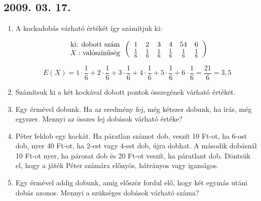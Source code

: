 \subsection*{2009. 03. 17.}
\begin{enumerate}
\item A kockadobás várható értékét így számítjuk ki: 

$$
\begin{array}{c}
\text{ki: dobott szám}\cr
X:\text{valószínűség}
\end{array}
\left(
\begin{array}{cccccc}
1&2&3&4&54&6\cr
\frac{1}{6}&
\frac{1}{6}&
\frac{1}{6}&
\frac{1}{6}&
\frac{1}{6}&
\frac{1}{6}
\end{array}
\right)
$$

$$
E(X)=
1\cdot\frac{1}{6}+
2\cdot\frac{1}{6}+
3\cdot\frac{1}{6}+
4\cdot\frac{1}{6}+
5\cdot\frac{1}{6}+
6\cdot\frac{1}{6}=
\frac{21}{6}=3{,}5
$$








\item Számítsuk ki a két kockával dobott pontok összegének várható értékét.

\item Egy érmével dobunk. Ha az eredmény fej, még kétszer dobunk, ha írás, még egyszer. Mennyi az összes fej dobások várható értéke?

\item Péter feldob egy kockát. Ha páratlan számot dob, veszít 10 Ft-ot, ha 6-ost dob, nyer 40 Ft-ot, ha 2-est vagy 4-est dob, újra dobhat. A második dobásnál 10 Ft-ot nyer, ha párosat dob és 20 Ft-ot veszít, ha páratlant dob. Döntsük el, hogy a játék Péter számára előnyös, hátrányos vagy igazságos.

\item Egy érmével addig dobunk, amíg először fordul elő, hogy két egymás utáni dobás azonos. Mennyi a szükséges dobások várható száma?
\end{enumerate}
